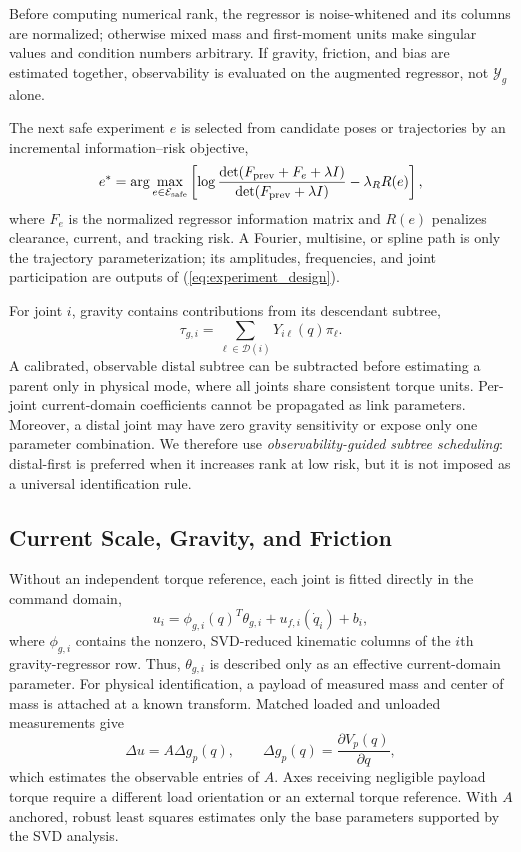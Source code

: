 \documentclass[conference]{IEEEtran}
\begin{document}
Before computing numerical rank, the regressor is noise-whitened and its
columns are normalized; otherwise mixed mass and first-moment units make
singular values and condition numbers arbitrary. If gravity, friction, and bias
are estimated together, observability is evaluated on the augmented regressor,
not $\mathcal Y_g$ alone.

The next safe experiment $e$ is selected from candidate poses or trajectories
by an incremental information--risk objective,
\begin{equation}
 e^*=\arg\max_{e\in\mathcal E_{\rm safe}}
 \left[\log\frac{\det(F_{\rm prev}+F_e+\lambda I)}
 {\det(F_{\rm prev}+\lambda I)}-\lambda_R R(e)\right],
 \label{eq:experiment_design}
\end{equation}
where $F_e$ is the normalized regressor information matrix and $R(e)$ penalizes
clearance, current, and tracking risk. A Fourier, multisine, or spline path is
only the trajectory parameterization; its amplitudes, frequencies, and joint
participation are outputs of (\ref{eq:experiment_design}).

For joint $i$, gravity contains contributions from its descendant subtree,
\begin{equation}
 \tau_{g,i}=\sum_{\ell\in\mathcal D(i)}Y_{i\ell}(q)\pi_\ell.
 \label{eq:subtree}
\end{equation}
A calibrated, observable distal subtree can be subtracted before estimating a
parent only in physical mode, where all joints share consistent torque units.
Per-joint current-domain coefficients cannot be propagated as link parameters.
Moreover, a distal joint may have zero gravity sensitivity or expose only one
parameter combination. We therefore use \emph{observability-guided
subtree scheduling}: distal-first is preferred when it increases rank at low
risk, but it is not imposed as a universal identification rule.

\subsection{Current Scale, Gravity, and Friction}
Without an independent torque reference, each joint is fitted directly in the
command domain,
\begin{equation}
 u_i=\phi_{g,i}(q)^T\theta_{g,i}+u_{f,i}(\dot q_i)+b_i,
 \label{eq:current_domain}
\end{equation}
where $\phi_{g,i}$ contains the nonzero, SVD-reduced kinematic columns of the
$i$th gravity-regressor row. Thus, $\theta_{g,i}$ is described only as an
effective current-domain parameter. For physical identification, a payload of
measured mass and center of mass is attached at a known transform. Matched
loaded and unloaded measurements give \cite{Gautier2012DriveGains}
\begin{equation}
 \Delta u=A\Delta g_p(q),\qquad
 \Delta g_p(q)=\frac{\partial V_p(q)}{\partial q},
 \label{eq:payload_scale}
\end{equation}
which estimates the observable entries of $A$. Axes receiving negligible
payload torque require a different load orientation or an external torque
reference. With $A$ anchored, robust least squares estimates only the base
parameters supported by the SVD analysis.
\end{document}
